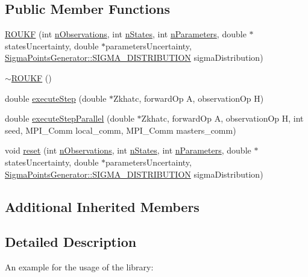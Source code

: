 \subsection*{Public Member Functions}
\begin{DoxyCompactItemize}
\item 
\mbox{\hyperlink{classROUKF_a16fd0fbe99e00745254f56052ad44f3f}{R\+O\+U\+KF}} (int \mbox{\hyperlink{classAbstractROUKF_a4f6403f7fd2fac691e4ac516f47c0a06}{n\+Observations}}, int \mbox{\hyperlink{classAbstractROUKF_af9ce480feb5d97761f20fdd546878aff}{n\+States}}, int \mbox{\hyperlink{classAbstractROUKF_a488f708dcdd66758cd879421cd454846}{n\+Parameters}}, double $\ast$states\+Uncertainty, double $\ast$parameters\+Uncertainty, \mbox{\hyperlink{classSigmaPointsGenerator_ad6f9474c0313425a10add120e0acf944}{Sigma\+Points\+Generator\+::\+S\+I\+G\+M\+A\+\_\+\+D\+I\+S\+T\+R\+I\+B\+U\+T\+I\+ON}} sigma\+Distribution)
\item 
\mbox{\hyperlink{classROUKF_aefba1ab1ab07bed45f43897c19f4f0a2}{$\sim$\+R\+O\+U\+KF}} ()
\item 
double \mbox{\hyperlink{classROUKF_ad200c0176a1e6e443fbea55bd8905dd6}{execute\+Step}} (double $\ast$Zkhatc, forward\+Op A, observation\+Op H)
\item 
double \mbox{\hyperlink{classROUKF_a0494bdc8ad1870dabb80581794dccc58}{execute\+Step\+Parallel}} (double $\ast$Zkhatc, forward\+Op A, observation\+Op H, int seed, M\+P\+I\+\_\+\+Comm local\+\_\+comm, M\+P\+I\+\_\+\+Comm masters\+\_\+comm)
\item 
void \mbox{\hyperlink{classROUKF_add2b1ded99b16046f706557a2129d41a}{reset}} (int \mbox{\hyperlink{classAbstractROUKF_a4f6403f7fd2fac691e4ac516f47c0a06}{n\+Observations}}, int \mbox{\hyperlink{classAbstractROUKF_af9ce480feb5d97761f20fdd546878aff}{n\+States}}, int \mbox{\hyperlink{classAbstractROUKF_a488f708dcdd66758cd879421cd454846}{n\+Parameters}}, double $\ast$states\+Uncertainty, double $\ast$parameters\+Uncertainty, \mbox{\hyperlink{classSigmaPointsGenerator_ad6f9474c0313425a10add120e0acf944}{Sigma\+Points\+Generator\+::\+S\+I\+G\+M\+A\+\_\+\+D\+I\+S\+T\+R\+I\+B\+U\+T\+I\+ON}} sigma\+Distribution)
\end{DoxyCompactItemize}
\subsection*{Additional Inherited Members}


\subsection{Detailed Description}
An example for the usage of the library\+:


